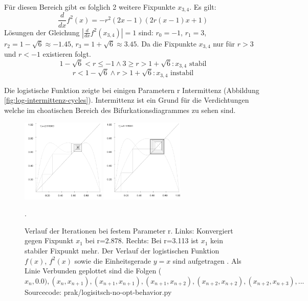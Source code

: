 \documentclass[12pt,a4paper]{article}
\begin{document}
Für diesen Bereich gibt es folglich 2 weitere Fixpunkte $x_{3,4}$. 
Es gilt:
\begin{equation}
\frac{d}{dx}f^2(x)=-r^2(2x-1)(2r(x-1)x+1)
\end{equation}
Lösungen der Gleichung $|\frac{d}{dx}f^2(x_{3,4})|=1$ sind: $r_0=-1$, $r_1=3$, $r_2=1-\sqrt{6}\approx-1.45$, $r_3=1+\sqrt{6}\approx3.45$. Da die Fixpunkte $x_{3,4}$ nur für $r>3$ und $r<-1$ existieren folgt.
\begin{equation}1-\sqrt{6}< r \leq -1 \wedge 3 \geq r > 1+\sqrt{6}: x_{3,4} \text{ stabil}
\end{equation}
\begin{equation}r < 1-\sqrt{6} \wedge r>1+\sqrt{6}: x_{3,4} \text{ instabil}
\end{equation}

Die logistische Funktion zeigte bei einigen Parametern r Intermittenz (Abbildung \ref{fig:log-intermittenz-cycles}). Intermittenz ist ein Grund für die Verdichtungen welche im choatischen Bereich des Bifurkationsdiagrammes zu sehen sind.

\begin{figure}[!htbp]
\centering
\includegraphics[height=150px]{fixpunkt-2878}
\includegraphics[height=150px]{fixpunkt-311}
\caption{Verlauf der Iterationen bei festem Parameter r. Links: Konvergiert gegen Fixpunkt $x_1$ bei r=2.878. Rechts: Bei r=3.113 ist $x_1$ kein stabiler Fixpunkt mehr. Der Verlauf der logistischen Funktion $f(x)$, $f^2(x)$ sowie die Einheitsgerade $y=x$ sind aufgetragen . Als Linie Verbunden geplottet sind die Folgen ($x_n, 0.0), (x_n, x_{n+1}), (x_{n+1}, x_{n+1}), (x_{n+1}, x_{n+2}), (x_{n+2}, x_{n+2}), (x_{n+2}, x_{n+3}), ...$ Sourcecode: prak/logisitsch-no-opt-behavior.py}. 
\label{fig:log-iteration-behavior}
\end{figure}
\end{document}
